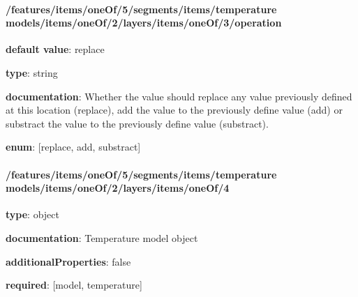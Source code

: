 \begin{itemized}
\end{itemized}\paragraph{/features/items/oneOf/5/segments/items/temperature models/items/oneOf/2/layers/items/oneOf/3/operation} \begin{itemized}
\item {\bf default value}: replace
\item {\bf type}: string
\item {\bf documentation}: Whether the value should replace any value previously defined at this location (replace), add the value to the previously define value (add) or substract the value to the previously define value (substract).
\item {\bf enum}: [replace, add, substract]\end{itemized}\paragraph{/features/items/oneOf/5/segments/items/temperature models/items/oneOf/2/layers/items/oneOf/4} \begin{itemized}
\item {\bf type}: object
\item {\bf documentation}: Temperature model object
\item {\bf additionalProperties}: false
\item {\bf required}: [model, temperature]\end{itemized}
